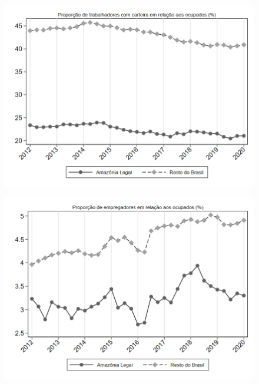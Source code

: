 \begin{frame}[label=_estrutura_emprego_prop_empregadoCC]{}
\textit{\hyperlink{_estrutura_emprego}{}}
\begin{figure}
  \centering
  \includegraphics[width=1.0\linewidth]{../../analysis/output/estrutura_emprego/_estrutura_emprego_prop_empregadoCC.png}
  \caption{}
  \label{fig:_estrutura_emprego_prop_empregadoCC}
\end{figure}
\end{frame}

\begin{frame}[label=_estrutura_emprego_prop_empregador]{}
\textit{\hyperlink{_estrutura_emprego}{}}
\begin{figure}
  \centering
  \includegraphics[width=1.0\linewidth]{../../analysis/output/estrutura_emprego/_estrutura_emprego_prop_empregador.png}
  \caption{}
  \label{fig:_estrutura_emprego_prop_empregador}
\end{figure}
\end{frame}



